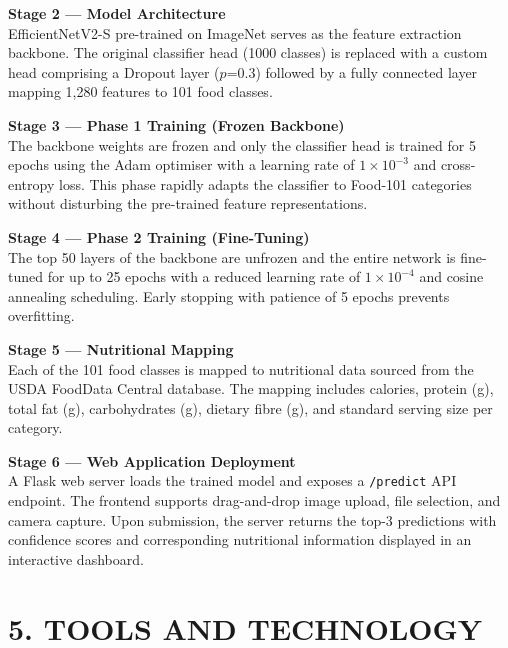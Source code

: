 \documentclass[12pt,a4paper]{article}
\begin{document}
\textbf{Stage 2 --- Model Architecture}\\
EfficientNetV2-S pre-trained on ImageNet serves as the feature extraction backbone. The original classifier head (1000 classes) is replaced with a custom head comprising a Dropout layer ($p$=0.3) followed by a fully connected layer mapping 1,280 features to 101 food classes.

\textbf{Stage 3 --- Phase 1 Training (Frozen Backbone)}\\
The backbone weights are frozen and only the classifier head is trained for 5 epochs using the Adam optimiser with a learning rate of $1\times10^{-3}$ and cross-entropy loss. This phase rapidly adapts the classifier to Food-101 categories without disturbing the pre-trained feature representations.

\textbf{Stage 4 --- Phase 2 Training (Fine-Tuning)}\\
The top 50 layers of the backbone are unfrozen and the entire network is fine-tuned for up to 25 epochs with a reduced learning rate of $1\times10^{-4}$ and cosine annealing scheduling. Early stopping with patience of 5 epochs prevents overfitting.

\textbf{Stage 5 --- Nutritional Mapping}\\
Each of the 101 food classes is mapped to nutritional data sourced from the USDA FoodData Central database. The mapping includes calories, protein (g), total fat (g), carbohydrates (g), dietary fibre (g), and standard serving size per category.

\textbf{Stage 6 --- Web Application Deployment}\\
A Flask web server loads the trained model and exposes a \texttt{/predict} API endpoint. The frontend supports drag-and-drop image upload, file selection, and camera capture. Upon submission, the server returns the top-3 predictions with confidence scores and corresponding nutritional information displayed in an interactive dashboard.


\newpage
\section{5. TOOLS AND TECHNOLOGY}
\end{document}
